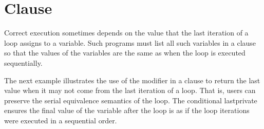 \section{ Clause}
\label{sec:lastprivate}

Correct execution sometimes depends on the value that the last iteration of a loop 
assigns to a variable. Such programs must list all such variables in a  
clause  so that the values of the variables are the same as when the loop is executed 
sequentially.


\clearpage

The next example illustrates the use of the  modifier in
a  clause to return the last value when it may not come from
the last iteration of a loop.
That is, users can preserve the serial equivalence semantics of the loop.
The conditional lastprivate ensures the final value of the variable after the loop 
is as if the loop iterations were executed in a sequential order.


